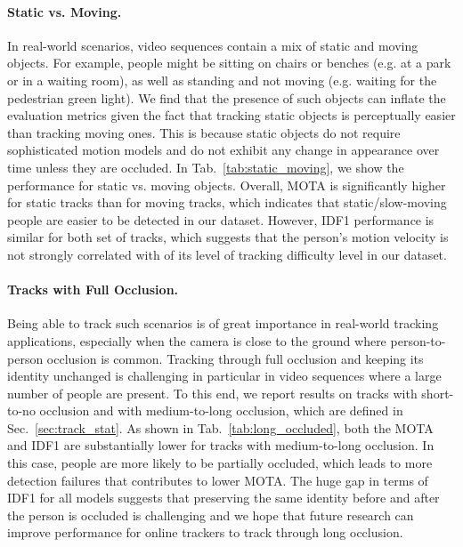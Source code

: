 \documentclass[runningheads]{llncs}
\begin{document}
\paragraph{\textbf{Static vs. Moving.}}
In real-world scenarios, video sequences contain a mix of static and moving objects. For example, people might be sitting on chairs or benches (e.g. at a park or in a waiting room), as well as standing and not moving (e.g. waiting for the pedestrian green light). We find that the presence of such objects can inflate the evaluation metrics given the fact that tracking static objects is perceptually easier than tracking moving ones. This is because static objects do not require sophisticated motion models and do not exhibit any change in appearance over time unless they are occluded. In Tab.~\ref{tab:static_moving}, we show the performance for static vs. moving objects. Overall, MOTA is significantly higher for static tracks than for moving tracks, which indicates that static/slow-moving people are easier to be detected in our dataset.  However, IDF1 performance is similar for both set of tracks, which suggests that the person's motion velocity is not strongly correlated with of its level of tracking difficulty level in our dataset.



\paragraph{\textbf{Tracks with Full Occlusion.}}
Being able to track such scenarios is of great importance in real-world tracking applications, especially when the camera is close to the ground where person-to-person occlusion is common. Tracking through full occlusion and keeping its identity unchanged is challenging in particular in video sequences where a large number of people are present. 
To this end, we report results on tracks with short-to-no occlusion and with medium-to-long occlusion, which are defined in Sec.~\ref{sec:track_stat}. As shown in Tab.~\ref{tab:long_occluded}, both the MOTA and IDF1 are substantially lower for tracks with medium-to-long occlusion. In this case, people are more likely to be partially occluded, which leads to more detection failures that contributes to lower MOTA. 
The huge gap in terms of IDF1 for all models suggests that preserving the same identity before and after the person is occluded is challenging and we hope that future research can improve performance for online trackers to track through long occlusion.
\end{document}
